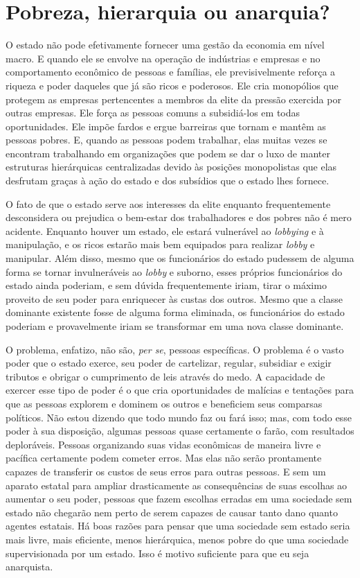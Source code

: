 \section{Pobreza, hierarquia ou anarquia?}

O estado não pode efetivamente fornecer uma gestão da economia em nível macro. E quando ele se envolve na operação de indústrias e empresas e no comportamento econômico de pessoas e famílias, ele previsivelmente reforça a riqueza e poder daqueles que já são ricos e poderosos. Ele cria monopólios que protegem as empresas pertencentes a membros da elite da pressão exercida por outras empresas. Ele força as pessoas comuns a subsidiá-los em todas oportunidades. Ele impõe fardos e ergue barreiras que tornam e mantêm as pessoas pobres. E, quando as pessoas podem trabalhar, elas muitas vezes se encontram trabalhando em organizações que podem se dar o luxo de manter estruturas hierárquicas centralizadas devido às posições monopolistas que elas desfrutam graças à ação do estado e dos subsídios que o estado lhes fornece.

O fato de que o estado serve aos interesses da elite enquanto frequentemente desconsidera ou prejudica o bem-estar dos trabalhadores e dos pobres não é mero acidente. Enquanto houver um estado, ele estará vulnerável ao \emph{lobbying} e à manipulação, e os ricos estarão mais bem equipados para realizar \emph{lobby} e manipular. Além disso, mesmo que os funcionários do estado pudessem de alguma forma se tornar invulneráveis ao \emph{lobby} e suborno, esses próprios funcionários do estado ainda poderiam, e sem dúvida frequentemente iriam, tirar o máximo proveito de seu poder para enriquecer às custas dos outros. Mesmo que a classe dominante existente fosse de alguma forma eliminada, os funcionários do estado poderiam e provavelmente iriam se transformar em uma nova classe dominante.

O problema, enfatizo, não são, \emph{per se}, pessoas específicas. O problema é o vasto poder que o estado exerce, seu poder de cartelizar, regular, subsidiar e exigir tributos e obrigar o cumprimento de leis através do medo. A capacidade de exercer esse tipo de poder é o que cria oportunidades de malícias e tentações para que as pessoas explorem e dominem os outros e beneficiem seus comparsas políticos. Não estou dizendo que todo mundo faz ou fará isso; mas, com todo esse poder à sua disposição, algumas pessoas quase certamente o farão, com resultados deploráveis. Pessoas organizando suas vidas econômicas de maneira livre e pacífica certamente podem cometer erros. Mas elas não serão prontamente capazes de transferir os custos de seus erros para outras pessoas. E sem um aparato estatal para ampliar drasticamente as consequências de suas escolhas ao aumentar o seu poder, pessoas que fazem escolhas erradas em uma sociedade sem estado não chegarão nem perto de serem capazes de causar tanto dano quanto agentes estatais. Há boas razões para pensar que uma sociedade sem estado seria mais livre, mais eficiente, menos hierárquica, menos pobre do que uma sociedade supervisionada por um estado. Isso é motivo suficiente para que eu seja anarquista.